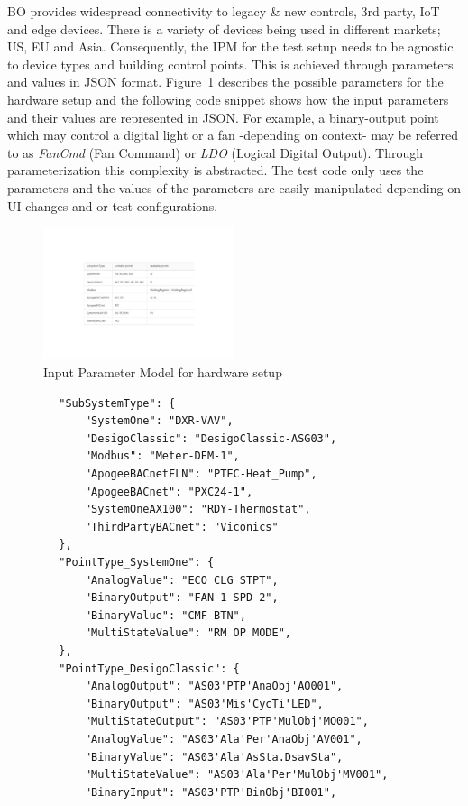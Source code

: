 \documentclass[conference]{IEEEtran}
\begin{document}
	BO provides widespread connectivity to legacy \& new controls, 3rd party, IoT and edge devices. There is a variety of devices being used in different markets; US, EU and Asia. 
	Consequently, the IPM for the test setup needs to be agnostic to device types and building control points.
	This is achieved through parameters and values in JSON format.
	Figure~\ref{fig:commandingIPM} describes the possible parameters for the hardware setup and the following code snippet shows how the input parameters and their values are represented in JSON. 
	For example, a binary-output point which may control a digital light or a fan -depending on context- may be referred to as \textit{FanCmd} (Fan Command) or \textit{LDO} (Logical Digital Output).
  Through parameterization this complexity is abstracted. The test code only uses the parameters and the values of the parameters are easily manipulated depending on UI changes and or test configurations.
	
	\begin{figure}[!t]
		\includegraphics[width=0.50\textwidth,]{commandingIPM.pdf}
		\caption{Input Parameter Model for hardware setup}
		\label{fig:commandingIPM}
	\end{figure}

	
	\begin{lstlisting}
		"SubSystemType": {
			"SystemOne": "DXR-VAV",
			"DesigoClassic": "DesigoClassic-ASG03",
			"Modbus": "Meter-DEM-1",
			"ApogeeBACnetFLN": "PTEC-Heat_Pump",
			"ApogeeBACnet": "PXC24-1",
			"SystemOneAX100": "RDY-Thermostat",
			"ThirdPartyBACnet": "Viconics"
		},
		"PointType_SystemOne": {
			"AnalogValue": "ECO CLG STPT",
			"BinaryOutput": "FAN 1 SPD 2",
			"BinaryValue": "CMF BTN",
			"MultiStateValue": "RM OP MODE",
		},
		"PointType_DesigoClassic": {
			"AnalogOutput": "AS03'PTP'AnaObj'AO001",
			"BinaryOutput": "AS03'Mis'CycTi'LED",
			"MultiStateOutput": "AS03'PTP'MulObj'MO001",
			"AnalogValue": "AS03'Ala'Per'AnaObj'AV001",
			"BinaryValue": "AS03'Ala'AsSta.DsavSta",
			"MultiStateValue": "AS03'Ala'Per'MulObj'MV001",
			"BinaryInput": "AS03'PTP'BinObj'BI001",	
	\end{lstlisting}
\end{document}
